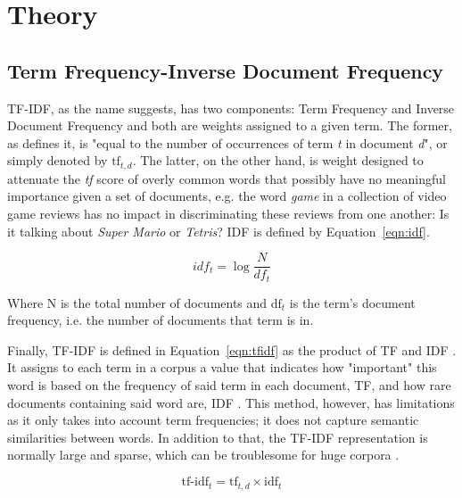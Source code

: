 \thispagestyle{plain}

\section{Theory}

\subsection{Term Frequency-Inverse Document Frequency}

TF-IDF, as the name suggests, has two components: Term Frequency and Inverse Document Frequency and both are weights assigned to a given term. The former, as \cite{manning2008introduction} defines it, is "equal to the number of occurrences of term \textit{t} in document \textit{d}", or simply denoted by  $\textrm{tf}_{t,d}$.  The latter, on the other hand,  is weight designed to attenuate the \textit{tf} score of  overly common words that possibly have no meaningful importance given a set of documents, e.g. the word \textit{game} in a collection of video game reviews has no impact in discriminating these reviews from one another: Is it talking about \textit{Super Mario} or \textit{Tetris}? IDF is defined by Equation~\ref{eqn:idf}.

\begin{equation}
	\label{eqn:idf}
	idf_t = \log \frac{N}{df_t}
\end{equation}

Where N is the total number of documents and $\textrm{df}_{t}$ is the term's document frequency, i.e. the number of documents that term is in.

Finally, TF-IDF is defined in Equation~\ref{eqn:tfidf} as the product of TF and IDF \citep{manning2008introduction}. It assigns to each term  in a corpus a value that indicates how "important" this word is based on the frequency of said term in each document, TF,  and how rare documents containing said word are, IDF \citep{manning2008introduction}. This method, however, has limitations as it only takes into account term frequencies; it does not capture semantic similarities between words. In addition to that, the TF-IDF representation is normally large and sparse, which can be troublesome for huge corpora \citep{kuhlmann-lec2-2020}.

\begin{equation}
	\label{eqn:tfidf}
	\textrm{tf-idf}_t = \textrm{tf}_{t,d} \times \textrm{idf}_t
\end{equation}


